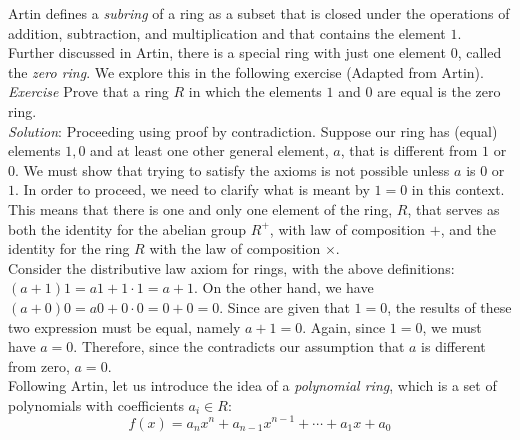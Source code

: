 Artin defines a \textit{subring}  of a ring as a subset that is closed under the operations of addition, subtraction, and multiplication and that contains the element $1$.\\

Further discussed in Artin, there is a special ring with just one element $0$, called the \textit{zero ring}.  We explore this in the following exercise (Adapted from Artin).\\

\textit{Exercise} Prove that a ring $R$ in which the elements $1$ and $0$ are equal is the zero ring.\\

\textit{Solution}:  %
Proceeding using proof by contradiction.  Suppose our ring has (equal) elements $1,0$ and at least one other general element, $a$, that is different from $1$ or $0$.  We must show that trying to satisfy the axioms is not possible unless $a$ is $0$ or $1$.  In order to proceed, we need to clarify what is meant by $1=0$ in this context.  This means that there is one and only one element of the ring, $R$, that serves as both the identity for the abelian group $R^{+}$, with law of composition $+$, and the identity for the ring $R$ with the law of composition $\times$.\\  %

Consider the distributive law axiom for rings, with the above definitions:  $(a+1)1=a1+1\cdot1=a+1$.  On the other hand, we have $(a+0)0=a0 +0 \cdot 0=0+0=0$.  Since are given that $1=0$, the results of these two expression must be equal, namely $a+1=0$.  Again, since $1=0$, we must have $a=0$.  Therefore, since the contradicts our assumption that $a$ is different from zero, $a=0$.\\

Following Artin, let us introduce the idea of a \textit{polynomial ring}, which is a set of polynomials with coefficients $a_{i} \in R$:\\

\begin{displaymath}
f(x)=a_{n}x^{n}+a_{n-1}x^{n-1}+\cdots+a_{1}x + a_{0}
\end{displaymath}

